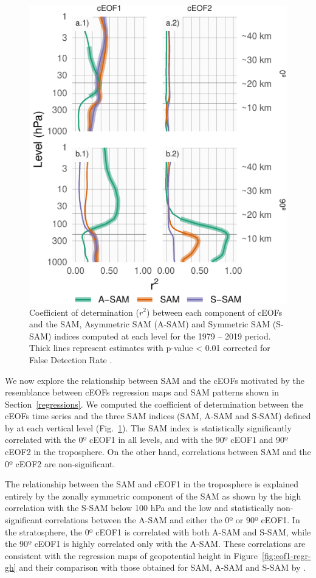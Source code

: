 \documentclass[pdflatex,lineno,sn-basic]{sn-jnl}
\theoremstyle{thmstyleone}%
\theoremstyle{thmstyletwo}%
\theoremstyle{thmstylethree}%
\begin{document}
\begin{figure}
\centering
\includegraphics{shceof_files/figure-latex/sam-eof-vertical-1.pdf}
\caption{\label{fig:sam-eof-vertical}Coefficient of determination (\(r^2\)) between each component of cEOFs and the SAM, Asymmetric SAM (A-SAM) and Symmetric SAM (S-SAM) indices computed at each level for the 1979 -- 2019 period. Thick lines represent estimates with p-value \textless{} 0.01 corrected for False Detection Rate \citep{benjamini1995}.}
\end{figure}

We now explore the relationship between SAM and the cEOFs motivated by the resemblance between cEOFs regression maps and SAM patterns shown in Section~\ref{regressions}.
We computed the coefficient of determination between the cEOFs time series and the three SAM indices (SAM, A-SAM and S-SAM) defined by \citet{campitelli2022} at each vertical level (Fig.~\ref{fig:sam-eof-vertical}).
The SAM index is statistically significantly correlated with the 0º cEOF1 in all levels, and with the 90º cEOF1 and 90º cEOF2 in the troposphere.
On the other hand, correlations between SAM and the 0º cEOF2 are non-significant.

The relationship between the SAM and cEOF1 in the troposphere is explained entirely by the zonally symmetric component of the SAM as shown by the high correlation with the S-SAM below 100 hPa and the low and statistically non-significant correlations between the A-SAM and either the 0º or 90º cEOF1.
In the stratosphere, the 0º cEOF1 is correlated with both A-SAM and S-SAM, while the 90º cEOF1 is highly correlated only with the A-SAM.
These correlations are consistent with the regression maps of geopotential height in Figure~\ref{fig:eof1-regr-gh} and their comparison with those obtained for SAM, A-SAM and S-SAM by \citet{campitelli2022}.
\end{document}

